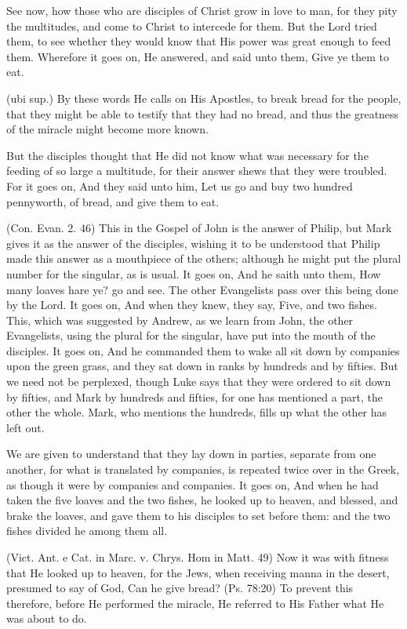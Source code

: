  See now, how those who are disciples of Christ grow in love to man, for they pity the multitudes, and come to Christ to intercede for them. But the Lord tried them, to see whether they would know that His power was great enough to feed them. Wherefore it goes on, He answered, and said unto them, Give ye them to eat.

 (ubi sup.) By these words He calls on His Apostles, to break bread for the people, that they might be able to testify that they had no bread, and thus the greatness of the miracle might become more known.

 But the disciples thought that He did not know what was necessary for the feeding of so large a multitude, for their answer shews that they were troubled. For it goes on, And they said unto him, Let us go and buy two hundred pennyworth, of bread, and give them to eat.

 (Con. Evan. 2. 46) This in the Gospel of John is the answer of Philip, but Mark gives it as the answer of the disciples, wishing it to be understood that Philip made this answer as a mouthpiece of the others; although he might put the plural number for the singular, as is usual. It goes on, And he saith unto them, How many loaves hare ye? go and see. The other Evangelists pass over this being done by the Lord. It goes on, And when they knew, they say, Five, and two fishes. This, which was suggested by Andrew, as we learn from John, the other Evangelists, using the plural for the singular, have put into the mouth of the disciples. It goes on, And he commanded them to wake all sit down by companies upon the green grass, and they sat down in ranks by hundreds and by fifties. But we need not be perplexed, though Luke says that they were ordered to sit down by fifties, and Mark by hundreds and fifties, for one has mentioned a part, the other the whole. Mark, who mentions the hundreds, fills up what the other has left out.

 We are given to understand that they lay down in parties, separate from one another, for what is translated by companies, is repeated twice over in the Greek, as though it were by companies and companies. It goes on, And when he had taken the five loaves and the two fishes, he looked up to heaven, and blessed, and brake the loaves, and gave them to his disciples to set before them: and the two fishes divided he among them all.

 (Vict. Ant. e Cat. in Marc. v. Chrys. Hom in Matt. 49) Now it was with fitness that He looked up to heaven, for the Jews, when receiving manna in the desert, presumed to say of God, Can he give bread? (Ps. 78:20) To prevent this therefore, before He performed the miracle, He referred to His Father what He was about to do.

